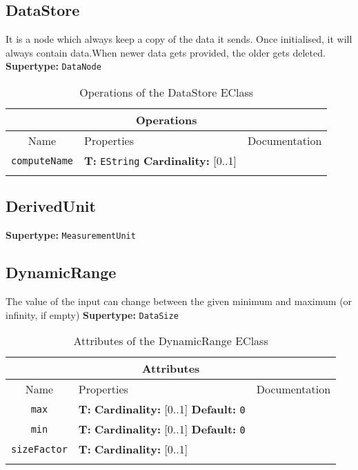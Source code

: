 \documentclass{article}
\begin{document}
\subsection[DataStore]{DataStore}
\label{e4smDataStore}

It is a node which always keep a copy of the data it sends. Once initialised, it will always contain data.When newer data gets provided, the older gets deleted.
\textbf{Supertype: }\texttt{DataNode}
\begin{table}[H]
\footnotesize
\begin{tabularx}{\textwidth}{|c| p{4 cm} | X |}
\hline
\multicolumn{3}{|c|}{\textbf{Operations}} \\
\hline
Name & Properties & Documentation \\ \hline \hline
\texttt{computeName}
 & 
\textbf{T:} \texttt{EString}
\newline
\textbf{Cardinality:} [0..1]
 & \\ \hline
\caption{Operations of the DataStore EClass}
\end{tabularx}
\label{e4smDataStoreop}
\end{table}
\subsection[DerivedUnit]{DerivedUnit}
\label{e4smDerivedUnit}

\textbf{Supertype: }\texttt{MeasurementUnit}
\subsection[DynamicRange]{DynamicRange}
\label{e4smDynamicRange}

The value of the input can change between the given minimum and maximum (or infinity, if empty)
\textbf{Supertype: }\texttt{DataSize}
\begin{table}[H]
\footnotesize
\begin{tabularx}{\textwidth}{|c| p{4 cm} | X |}
\hline
\multicolumn{3}{|c|}{\textbf{Attributes}} \\
\hline
Name & Properties & Documentation \\ \hline \hline
\texttt{max}
 & 
\textbf{T:} \texttt{}
\newline
\textbf{Cardinality:} [0..1]
\newline
\textbf{Default:} \texttt{0}
 & \\ \hline
\texttt{min}
 & 
\textbf{T:} \texttt{}
\newline
\textbf{Cardinality:} [0..1]
\newline
\textbf{Default:} \texttt{0}
 & \\ \hline
\texttt{sizeFactor}
 & 
\textbf{T:} \texttt{}
\newline
\textbf{Cardinality:} [0..1]
 & \\ \hline
\caption{Attributes of the DynamicRange EClass}
\end{tabularx}
\label{e4smDynamicRangeattr}
\end{table}
\end{document}
